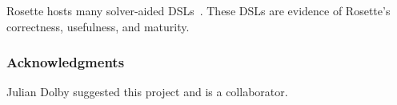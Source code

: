 \documentclass[preprint,9pt]{sigplanconf}
\begin{document}
Rosette hosts many solver-aided DSLs~\cite{wwtekt-oopsla-2016,pjstcb-pldi-2014}.
These DSLs are evidence of Rosette's correctness, usefulness, and maturity.


\subsubsection*{Acknowledgments}
Julian Dolby suggested this project and is a collaborator.



\end{document}
